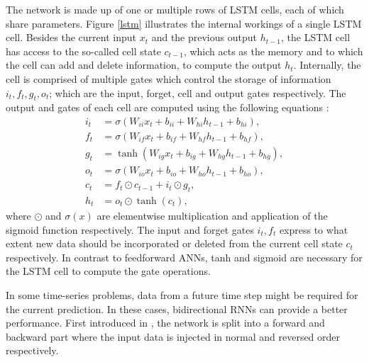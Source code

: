 The network is made up of one or multiple rows of LSTM cells, each of which share parameters.
Figure \ref{lstm} illustrates the internal workings of a single LSTM cell.
Besides the current input $x_t$ and the previous output $h_{t-1}$, the LSTM cell has access to the so-called cell state $c_{t-1}$, which acts as the memory and to which the cell can add and delete information, to compute the output $h_t$.
Internally, the cell is comprised of multiple gates which control the storage of information $i_t, f_t, g_t, o_t$; which are the input, forget, cell and output gates respectively.
The output and gates of each cell are computed using the following equations \cite{NEURIPS2019_9015}:
\begin{align*}
i_t & = \sigma (W_{ii} x_t + b_{ii} + W_{hi} h_{t-1} + b_{hi}), \\
f_t & = \sigma (W_{if} x_t + b_{if} + W_{hf} h_{t-1} + b_{hf}), \\
g_t & = \tanh (W_{ig} x_t + b_{ig} + W_{hg} h_{t-1} + b_{hg}), \\ 
o_t & = \sigma (W_{io} x_t + b_{io} + W_{ho} h_{t-1} + b_{ho}), \\
c_t & = f_t \odot c_{t-1} + i_t \odot g_t, \\
h_t & = o_t \odot \tanh (c_t),
\end{align*}
where $\odot$ and $\sigma(x)$ are elementwise multiplication and application of the sigmoid function respectively.
The input and forget gates $i_t, f_t$ express to what extent new data should be incorporated or deleted from the current cell state $c_t$ respectively.
In contrast to feedforward ANNs, tanh and sigmoid are necessary for the LSTM cell to compute the gate operations.

In some time-series problems, data from a future time step might be required for the current prediction.
In these cases, bidirectional RNNs can provide a better performance.
First introduced in \cite{bidirrnn}, the network is split into a forward and backward part where the input data is injected in normal and reversed order respectively.

